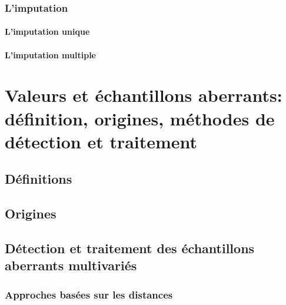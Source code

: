 \documentclass[]{book}
\let\oldparagraph\paragraph
\renewcommand{\paragraph}[1]{\oldparagraph{#1}\mbox{}}
\begin{document}
\hypertarget{limputation}{%
\subsubsection{L'imputation}\label{limputation}}

\hypertarget{limputation-unique}{%
\paragraph{L'imputation unique}\label{limputation-unique}}

\hypertarget{limputation-multiple}{%
\paragraph{L'imputation multiple}\label{limputation-multiple}}

\hypertarget{valeurs-et-uxe9chantillons-aberrants-duxe9finition-origines-muxe9thodes-de-duxe9tection-et-traitement}{%
\section{Valeurs et échantillons aberrants: définition, origines,
méthodes de détection et
traitement}\label{valeurs-et-uxe9chantillons-aberrants-duxe9finition-origines-muxe9thodes-de-duxe9tection-et-traitement}}

\hypertarget{duxe9finitions-1}{%
\subsection{Définitions}\label{duxe9finitions-1}}

\hypertarget{origines}{%
\subsection{Origines}\label{origines}}

\hypertarget{duxe9tection-et-traitement-des-uxe9chantillons-aberrants-multivariuxe9s}{%
\subsection{Détection et traitement des échantillons aberrants
multivariés}\label{duxe9tection-et-traitement-des-uxe9chantillons-aberrants-multivariuxe9s}}

\hypertarget{approches-basuxe9es-sur-les-distances}{%
\subsubsection{Approches basées sur les
distances}\label{approches-basuxe9es-sur-les-distances}}
\end{document}
